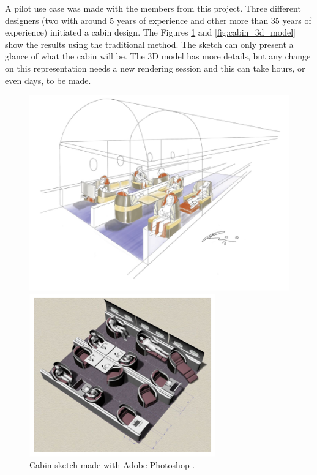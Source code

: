 A pilot use case was made with the members from this project. Three different designers (two with around 5 years of experience and other more than 35 years of experience) initiated a cabin design. 
The Figures \ref{fig:cabin_sketch} and \ref{fig:cabin_3d_model} show the results using the traditional method. The sketch can only present a glance of what the cabin will be. The 3D model has more details, but any change on this representation needs a new rendering session and this can take hours, or even days, to be made.

\begin{figure}[h]
\centering
\begin{minipage}{.45\textwidth}
    \centering
    \includegraphics[width = \linewidth]{Revisao/VR Cabin/Sketch.png}
    \vspace{0.4cm}
    \caption{Cabin sketch made with Adobe Photoshop \cite{moerland2021application}.}
    \label{fig:cabin_sketch}
\end{minipage}
\hfil
\begin{minipage}{.45\textwidth}
    \centering
    \includegraphics[width = \linewidth]{Revisao/VR Cabin/3D Model.png}

\end{minipage}
\end{figure}
